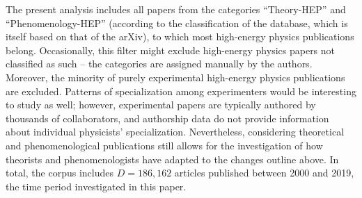 \documentclass{article}
\begin{document}
The present analysis includes all papers from the categories ``Theory-HEP'' and ``Phenomenology-HEP'' (according to the classification of the database, which is itself based on that of the arXiv), to which most high-energy physics publications belong. Occasionally, this filter might exclude high-energy physics papers not classified as such -- the categories are assigned manually by the authors. Moreover, the minority of purely experimental high-energy physics publications are excluded. Patterns of specialization among experimenters would be interesting to study as well; however, experimental papers are typically authored by thousands of collaborators, and authorship data do not provide information about individual physicists' specialization. Nevertheless, considering theoretical and phenomenological publications still allows for the investigation of how theorists and phenomenologists have adapted to the changes outline above. In total, the corpus includes $D=186,162$ articles published between 2000 and 2019, the time period investigated in this paper.
\end{document}
